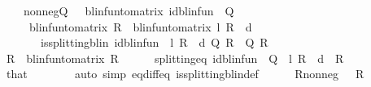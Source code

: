 \begin{isabellebody}
\ \ \ \ nonneg{\isacharunderscore}{\kern0pt}Q{\isacharcolon}{\kern0pt}\ {\isachardoublequoteopen}{}\ {\isasymle}\ blinfun{\isacharunderscore}{\kern0pt}to{\isacharunderscore}{\kern0pt}matrix\ {\isacharparenleft}{\kern0pt}id{\isacharunderscore}{\kern0pt}blinfun\ {\isacharminus}{\kern0pt}\ Q{\isacharparenright}{\kern0pt}{\isachardoublequoteclose}\isanewline
\ \ \ \ \ {\isachardoublequoteopen}{\isacharparenleft}{\kern0pt}blinfun{\isacharunderscore}{\kern0pt}to{\isacharunderscore}{\kern0pt}matrix\ R{\isacharparenright}{\kern0pt}\ {\isasymle}\ {\isacharparenleft}{\kern0pt}blinfun{\isacharunderscore}{\kern0pt}to{\isacharunderscore}{\kern0pt}matrix\ {\isacharparenleft}{\kern0pt}l\ {\isacharasterisk}{\kern0pt}\isactrlsub R\ {\isasymP}\ d{\isacharparenright}{\kern0pt}{\isacharparenright}{\kern0pt}{\isachardoublequoteclose}\isanewline
\ \ \ \ \ \ \ {\isachardoublequoteopen}is{\isacharunderscore}{\kern0pt}splitting{\isacharunderscore}{\kern0pt}blin\ {\isacharparenleft}{\kern0pt}id{\isacharunderscore}{\kern0pt}blinfun\ {\isacharminus}{\kern0pt}\ l\ {\isacharasterisk}{\kern0pt}\isactrlsub R\ {\isasymP}\ d{\isacharparenright}{\kern0pt}\ Q\ R{\isachardoublequoteclose}\ \ Q\ R\isanewline
\ \ \isamarkupfalse%
\ {\isacharminus}{\kern0pt}\isanewline
\ \ \ \ \isamarkupfalse%
\ {\isacharquery}{\kern0pt}R\ {\isacharequal}{\kern0pt}\ {\isachardoublequoteopen}blinfun{\isacharunderscore}{\kern0pt}to{\isacharunderscore}{\kern0pt}matrix\ R{\isachardoublequoteclose}\isanewline
\ \ \ \ \isamarkupfalse%
\ splitting{\isacharunderscore}{\kern0pt}eq{\isacharcolon}{\kern0pt}\ {\isachardoublequoteopen}id{\isacharunderscore}{\kern0pt}blinfun\ {\isacharminus}{\kern0pt}\ Q\ {\isacharequal}{\kern0pt}\ l\ {\isacharasterisk}{\kern0pt}\isactrlsub R\ {\isasymP}\ d\ {\isacharminus}{\kern0pt}\ R{\isachardoublequoteclose}\isanewline
\ \ \ \ \ \ \isamarkupfalse%
\ that\isanewline
\ \ \ \ \ \ \isamarkupfalse%
\ {\isacharparenleft}{\kern0pt}auto\ simp{\isacharcolon}{\kern0pt}\ eq{\isacharunderscore}{\kern0pt}diff{\isacharunderscore}{\kern0pt}eq\ is{\isacharunderscore}{\kern0pt}splitting{\isacharunderscore}{\kern0pt}blin{\isacharunderscore}{\kern0pt}def{\isacharprime}{\kern0pt}{\isacharparenright}{\kern0pt}\isanewline
\ \ \ \ \isamarkupfalse%
\ R{\isacharunderscore}{\kern0pt}nonneg{\isacharcolon}{\kern0pt}\ {\isachardoublequoteopen}{}\ {\isasymle}\ {\isacharquery}{\kern0pt}R{\isachardoublequoteclose}\isanewline

\end{isabellebody}
